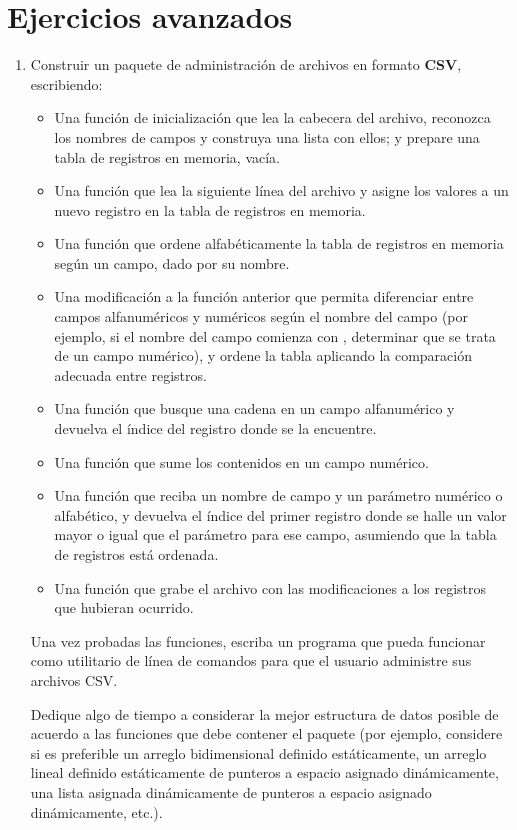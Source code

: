 \section{Ejercicios avanzados}
\begin{enumerate}
	\item Construir un paquete de administración de archivos en formato \textbf{CSV}, escribiendo:
	\begin{itemize}
		\item Una función de inicialización que lea la cabecera del archivo, reconozca los nombres de campos y construya una lista con ellos; y prepare una tabla de registros en memoria, vacía. 
		\item Una función que lea la siguiente línea del archivo y asigne los valores a un nuevo registro en la tabla de registros en memoria.
		\item Una función que ordene alfabéticamente la tabla de registros en memoria según un campo, dado por su nombre.
		\item Una modificación a la función anterior que permita diferenciar entre campos alfanuméricos y numéricos según el nombre del campo (por ejemplo, si el nombre del campo comienza con , determinar que se trata de un campo numérico), y ordene la tabla aplicando la comparación adecuada entre registros.
		\item Una función que busque una cadena en un campo alfanumérico y devuelva el índice del registro donde se la encuentre.
		\item Una función que sume los contenidos en un campo numérico.
		\item Una función que reciba un nombre de campo y un parámetro numérico o alfabético, y devuelva el índice del primer registro donde se halle un valor mayor o igual que el parámetro para ese campo, asumiendo que la tabla de registros está ordenada. 
		\item Una función que grabe el archivo con las modificaciones a los registros que hubieran ocurrido.
	\end{itemize}

Una vez probadas las funciones, escriba un programa que pueda funcionar como utilitario de línea de comandos para que el usuario administre sus archivos CSV.

Dedique algo de tiempo a considerar la mejor estructura de datos posible de acuerdo a las funciones que debe contener el paquete (por ejemplo, considere si es preferible un arreglo bidimensional definido estáticamente, un arreglo lineal definido estáticamente de punteros a espacio asignado dinámicamente, una lista asignada dinámicamente de punteros a espacio asignado dinámicamente, etc.).
\end{enumerate}
